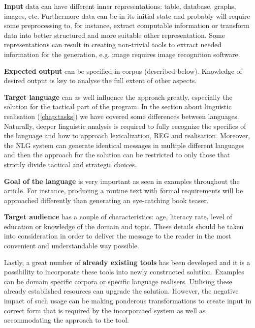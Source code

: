\textbf{Input} data can have different inner representations: table, database, graphs, images, etc. Furthermore data can be in its initial state and probably will require some preprocessing to, for instance, extract computable information or transform data into better structured and more suitable other representation. Some representations can result in creating non-trivial tools to extract needed information for the generation, e.g. image requires image recognition software.

\textbf{Expected output} can be specified in corpus (described below). Knowledge of desired output is key to analyse the full extent of other aspects.

\textbf{Target language} can as well influence the approach greatly, especially the solution for the tactical part of the program. In the section about linguistic realisation (\autoref{chap:tasks}) we have covered some differences between languages. Naturally, deeper linguistic analysis is required to fully recognize the specifics of the language and how to approach lexicalization, REG and realisation. Moreover, the NLG system can generate identical messages in multiple different languages and then the approach for the solution can be restricted to only those that strictly divide tactical and strategic choices.

\textbf{Goal of the language} is very important as seen in examples throughout the article. For instance, producing a routine text with formal requirements will be approached differently than generating an eye-catching book teaser.

\textbf{Target audience} has a couple of characteristics: age, literacy rate, level of education or knowledge of the domain and topic. These details should be taken into consideration in order to deliver the message to the reader in the most convenient and understandable way possible. 

Lastly, a great number of \textbf{already existing tools} has been developed and it is a possibility to incorporate these tools into newly constructed solution. Examples can be domain specific corpora or specific language realisers. Utilising these already established resources can upgrade the solution. However, the negative impact of such usage can be making ponderous transformations to create input in correct form that is required by the incorporated system as well as accommodating the approach to the tool.
 
